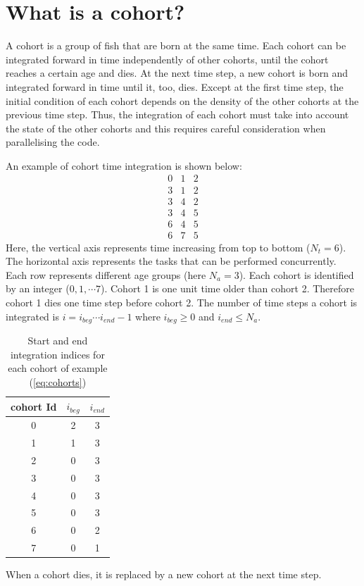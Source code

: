 \documentclass[a4paper,oneside,12pt]{article}
\begin{document}
\section{What is a cohort?}

A cohort is a group of fish that are born at the same time. Each cohort 
can be integrated forward in time independently of other cohorts, until the cohort reaches a certain age and dies. 
At the next time step, a new cohort is born and integrated forward in time until it, too, dies. Except 
at the first time step, the initial condition of each cohort depends on 
the density of the other cohorts at the previous time step. Thus, the integration of 
each cohort must take into account the state of the other cohorts and this requires 
careful consideration when parallelising the code.

An example of cohort time integration is shown below:
\begin{equation} \label{eq:cohorts}
\begin{array}{ccc}
0 & 1 & 2 \\
3 & 1 & 2 \\
3 & 4 & 2 \\
3 & 4 & 5 \\
6 & 4 & 5 \\
6 & 7 & 5
\end{array}
\end{equation}
Here, the vertical axis represents time increasing from top to bottom ($N_t = 6$). The horizontal axis represents the 
tasks that can be performed concurrently. Each row represents different age groups (here $N_a = 3$). 
Each cohort is identified by an integer ($0, 1, \cdots 7$). 
Cohort 1 is one unit time older than cohort 2. Therefore cohort 1 dies one time step before cohort 2. 
The number of time steps 
a cohort is integrated is $i = i_{beg} \cdots i_{end} - 1$ where $i_{beg} \geq 0$  and $i_{end} \leq N_a$.
\begin{table}[htbp]
    \centering %
    \caption{Start and end integration indices for each cohort of example (\ref{eq:cohorts})}
    \label{tab:cohort_indices}
    \begin{tabular}{c|cc} %
        \toprule %
        cohort Id & $i_{beg}$ & $i_{end}$ \\
        \midrule %
        0 & 2 & 3 \\
        1 & 1 & 3 \\
        2 & 0 & 3 \\
        3 & 0 & 3 \\
        4 & 0 & 3 \\
        5 & 0 & 3 \\
        6 & 0 & 2 \\
        7 & 0 & 1 \\
        \bottomrule %
    \end{tabular}
\end{table}
When a cohort dies, it is replaced by a new cohort at the next time step. 
\end{document}
